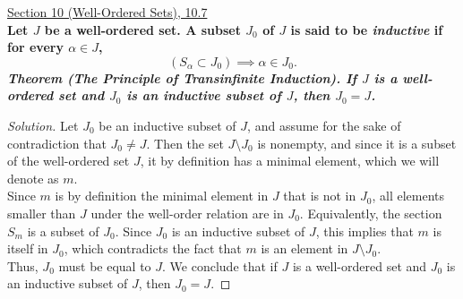 \documentclass[11pt]{article}
\newenvironment{solution}
  {\renewcommand\qedsymbol{$\blacksquare$}\begin{proof}[Solution]}
  {\end{proof}}
\begin{document}
\underline{Section 10 (Well-Ordered Sets), 10.7} \\

\textbf{Let $J$ be a well-ordered set. A subset $J_0$ of $J$ is said to be \textit{inductive} if for every $\alpha \in J$,}
\[
  (S_\alpha \subset J_0) \implies \alpha \in J_0.
\]
\textbf{\textit{Theorem (The Principle of Transinfinite Induction). If $J$ is a well-ordered set and $J_0$ is an inductive subset of $J$, then $J_0 = J$.}}

\begin{solution}
Let $J_0$ be an inductive subset of $J$, and assume for the sake of contradiction that $J_0 \neq J$. Then the set $J \setminus J_0$ is nonempty, and since it is a subset
of the well-ordered set $J$, it by definition has a minimal element, which we will denote as $m$. \\

Since $m$ is by definition the minimal element in $J$ that is not in $J_0$, all elements smaller than $J$ under the well-order relation are in $J_0$. 
Equivalently, the section $S_m$ is a subset of $J_0$. Since $J_0$ is an inductive subset of $J$, this implies that $m$ is itself in $J_0$, which contradicts the fact that
$m$ is an element in $J \setminus J_0$. \\

Thus, $J_0$ must be equal to $J$. We conclude that if $J$ is a well-ordered set and $J_0$ is an inductive subset of $J$, then $J_0 = J$.
\end{solution}
\end{document}

